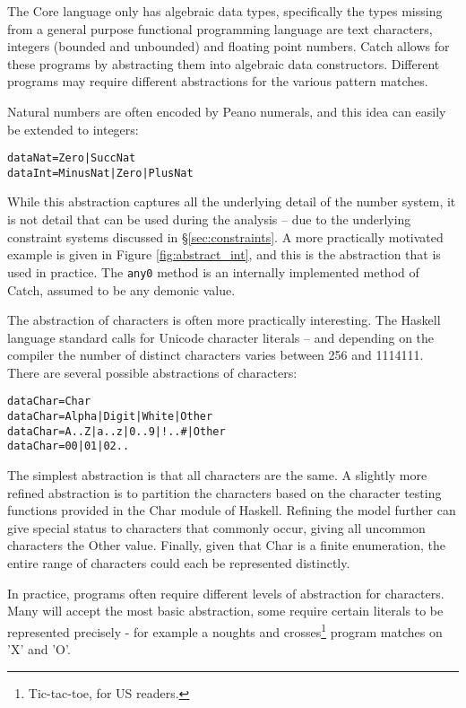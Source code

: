 \documentclass[preprint]{sigplanconf}
\newcommand{\T}[1]{\texttt{#1}}
\newcommand{\C}[1]{\textsf{#1}}
\newenvironment{code}{\begin{alltt}\small}{\end{alltt}}
\begin{document}
The Core language only has algebraic data types, specifically the types missing from a general purpose functional programming language are text characters, integers (bounded and unbounded) and floating point numbers. Catch allows for these programs by abstracting them into algebraic data constructors. Different programs may require different abstractions for the various pattern matches.

Natural numbers are often encoded by Peano numerals, and this idea can easily be extended to integers:

\begin{code}
data Nat  = Zero | Succ Nat
data Int  = Minus Nat | Zero | Plus Nat
\end{code}

While this abstraction captures all the underlying detail of the number system, it is not detail that can be used during the analysis -- due to the underlying constraint systems discussed in \S\ref{sec:constraints}. A more practically motivated example is given in Figure \ref{fig:abstract_int}, and this is the abstraction that is used in practice. The \T{any0} method is an internally implemented method of Catch, assumed to be any demonic value.

The abstraction of characters is often more practically interesting. The Haskell language standard calls for Unicode character literals -- and depending on the compiler the number of distinct characters varies between 256 and 1114111. There are several possible abstractions of characters:

\begin{code}
data Char = Char
data Char = Alpha | Digit | White | Other
data Char = A .. Z | a .. z | 0 .. 9 | ! .. # | Other
data Char = 00 | 01 | 02 ..
\end{code}

The simplest abstraction is that all characters are the same. A slightly more refined abstraction is to partition the characters based on the character testing functions provided in the \C{Char} module of Haskell. Refining the model further can give special status to characters that commonly occur, giving all uncommon characters the \C{Other} value. Finally, given that \C{Char} is a finite enumeration, the entire range of characters could each be represented distinctly.

In practice, programs often require different levels of abstraction for characters. Many will accept the most basic abstraction, some require certain literals to be represented precisely - for example a noughts and crosses\footnote{Tic-tac-toe, for US readers.} program matches on 'X' and 'O'.
\end{document}
